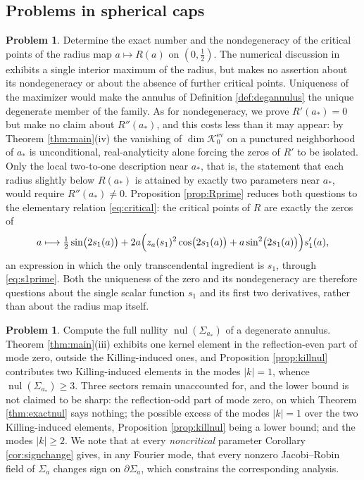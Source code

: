 \documentclass[11pt,a4paper]{amsart}
\theoremstyle{plain}
\theoremstyle{definition}
\newtheorem{problem}[theorem]{Problem}
\newcommand{\nul}{\operatorname{nul}}
\newcommand{\Ker}{\mathcal{K}}
\begin{document}
\subsection*{Problems in spherical caps}

\begin{problem}\label{prob:caps}
Determine the exact number and the nondegeneracy of the critical points of the radius map $a\mapsto R(a)$ on $(0,\tfrac12)$. The numerical discussion in \cite[Rem. 1.3]{NZ1} exhibits a single interior maximum of the radius, but makes no assertion about its nondegeneracy or about the absence of further critical points. Uniqueness of the maximizer would make the annulus of Definition \ref{def:degannulus} the unique degenerate member of the family. As for nondegeneracy, we prove $R'(a_*)=0$ but make no claim about $R''(a_*)$, and this costs less than it may appear: by Theorem \ref{thm:main}(iv) the vanishing of $\dim\Ker_0^{\mathrm{ev}}$ on a punctured neighborhood of $a_*$ is unconditional, real-analyticity alone forcing the zeros of $R'$ to be isolated. Only the local two-to-one description near $a_*$, that is, the statement that each radius slightly below $R(a_*)$ is attained by exactly two parameters near $a_*$, would require $R''(a_*)\neq 0$. Proposition \ref{prop:Rprime} reduces both questions to the elementary relation \eqref{eq:critical}: the critical points of $R$ are exactly the zeros of
\[
a\longmapsto \tfrac12\sin\bigl(2s_1(a)\bigr)+2a\Bigl(z_a(s_1)^2\cos\bigl(2s_1(a)\bigr)+a\sin^2\bigl(2s_1(a)\bigr)\Bigr)s_1'(a),
\]
an expression in which the only transcendental ingredient is $s_1$, through \eqref{eq:s1prime}. Both the uniqueness of the zero and its nondegeneracy are therefore questions about the single scalar function $s_1$ and its first two derivatives, rather than about the radius map itself.
\end{problem}

\begin{problem}\label{prob:fullnullity}
Compute the full nullity $\nul(\Sigma_{a_*})$ of a degenerate annulus. Theorem \ref{thm:main}(iii) exhibits one kernel element in the reflection-even part of mode zero, outside the Killing-induced ones, and Proposition \ref{prop:killnul} contributes two Killing-induced elements in the modes $|k|=1$, whence $\nul(\Sigma_{a_*})\geq 3$. Three sectors remain unaccounted for, and the lower bound is not claimed to be sharp: the reflection-odd part of mode zero, on which Theorem \ref{thm:exactnul} says nothing; the possible excess of the modes $|k|=1$ over the two Killing-induced elements, Proposition \ref{prop:killnul} being a lower bound; and the modes $|k|\geq 2$. We note that at every \emph{noncritical} parameter Corollary \ref{cor:signchange} gives, in any Fourier mode, that every nonzero Jacobi--Robin field of $\Sigma_a$ changes sign on $\partial\Sigma_a$, which constrains the corresponding analysis.
\end{problem}
\end{document}
